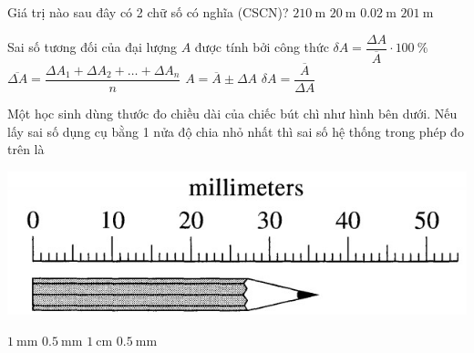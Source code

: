 \begin{ex}
	Giá trị nào sau đây có 2 chữ số có nghĩa (CSCN)?
	\choice
	{\True $\SI{210}{\meter}$}
	{$\SI{20}{\meter}$}
	{$\SI{0.02}{\meter}$}
	{$\SI{201}{\meter}$}
	\loigiai{}
\end{ex}
\begin{ex}
	Sai số tương đối của đại lượng $A$ được tính bởi công thức	
	\choice
	{\True $\delta A=\dfrac{\Delta A}{\overline{A}}\cdot\SI{100}{\percent}$}
	{$\overline{\Delta A}=\dfrac{\Delta A_1+\Delta A_2+\dots+\Delta A_n}{n}$}
	{$A=\overline{A}\pm\Delta A$}
	{$\delta A=\dfrac{\overline{A}}{\Delta A}$}
	\loigiai{}
\end{ex}

\begin{ex}
	Một học sinh dùng thước đo chiều dài của chiếc bút chì như hình bên dưới. Nếu lấy sai số dụng cụ bằng 1 nửa độ chia nhỏ nhất thì sai số hệ thống trong phép đo trên là	
	\begin{center}
		\includegraphics[width=0.4\linewidth]{figs/G10-CHUONG1-1}
	\end{center}
	\choice
	{$\SI{1}{\milli\meter}$}
	{\True $\SI{0.5}{\milli\meter}$}
	{$\SI{1}{\centi\meter}$}
	{$\SI{0.5}{\milli\meter}$}
	\loigiai{}
\end{ex}

